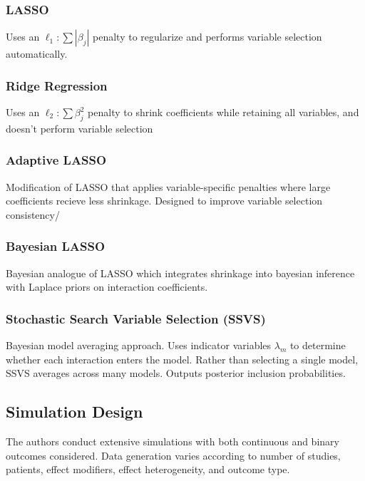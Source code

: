 \documentclass[11pt]{article}
\begin{document}
\subsubsection*{LASSO}

Uses an $\ell_1: \sum |\beta_j|$ penalty to regularize and performs variable selection automatically.

\subsubsection*{Ridge Regression}

Uses an $\ell_2: \sum \beta_j^2$ penalty to shrink coefficients while retaining all variables, and doesn't perform variable selection

\subsubsection*{Adaptive LASSO}

Modification of LASSO that applies variable-specific penalties where large coefficients recieve less shrinkage. Designed to improve variable selection consistency/

\subsubsection*{Bayesian LASSO}

Bayesian analogue of LASSO which integrates shrinkage into bayesian inference with Laplace priors on interaction coefficients.

\subsubsection*{Stochastic Search Variable Selection (SSVS)}

Bayesian model averaging approach. Uses indicator variables $\lambda_m$ to determine whether each interaction enters the model. Rather than selecting a single model, SSVS averages across many models. Outputs posterior inclusion probabilities.

\subsection*{Simulation Design}

The authors conduct extensive simulations with both continuous and binary outcomes considered. Data generation varies according to number of studies, patients, effect modifiers, effect heterogeneity, and outcome type.
\end{document}
